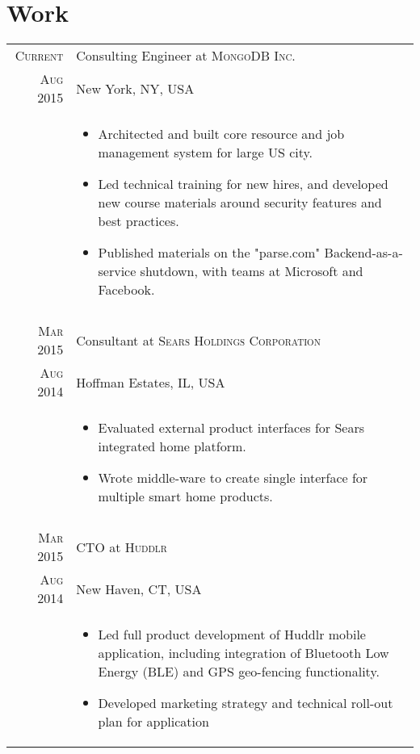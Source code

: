 \documentclass[a4paper,10pt]{article}
\begin{document}
\section{Work}
\begin{longtable}{r|p{11cm}}
 \nopagebreak \textsc{Current} & Consulting Engineer at \textsc{MongoDB Inc.}\\
 \nopagebreak \textsc{Aug 2015} & \small{New York, NY, USA} \\
 \nopagebreak & \footnotesize{
	\begin{itemize}
		\item[]{
			Architected and built core resource
			and job management system for large US city.
		}
		\item[]{
			Led technical training for new hires, and developed new
			course materials around security features and best 
			practices.
		}
		\item[]{
			Published materials on the "parse.com" Backend-as-a-service
			shutdown, with teams at Microsoft and Facebook.
		}
	\end{itemize}
   }\\
 \multicolumn{2}{c}{} \\
 \nopagebreak \textsc{Mar 2015} & Consultant at \textsc{Sears Holdings Corporation}\\
 \nopagebreak \textsc{Aug 2014} & \small{Hoffman Estates, IL, USA}\\
 \nopagebreak & \footnotesize{
	\begin{itemize}
		\item[]{
			Evaluated external product interfaces for Sears integrated home platform.
		}
		\item[]{
			Wrote middle-ware to create single interface for multiple smart home products.
		}
	\end{itemize}
   }\\
 \multicolumn{2}{c}{} \\
 \nopagebreak \textsc{Mar 2015} & CTO at \textsc{Huddlr}\\
 \nopagebreak \textsc{Aug 2014} & \small{New Haven, CT, USA}\\
 \nopagebreak & \footnotesize{
	\begin{itemize}
		\item[]{
			Led full product development of Huddlr mobile application, including
			integration of Bluetooth Low Energy (BLE) and GPS geo-fencing functionality.
		}
		\item[]{
			Developed marketing strategy and technical roll-out plan for application
}
\end{itemize}}
\end{longtable}
\end{document}
